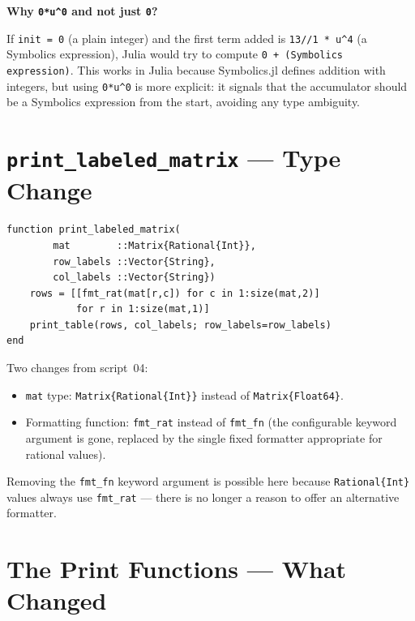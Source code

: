 \documentclass[12pt, a4paper]{article}
\newcommand{\cd}[1]{\texttt{#1}}
\begin{document}
\begin{notebox}
\textbf{Why \cd{0*u\^{}0} and not just \cd{0}?}

If \cd{init = 0} (a plain integer) and the first term
added is \cd{13//1 * u\^{}4} (a Symbolics expression),
Julia would try to compute \cd{0 + (Symbolics expression)}.
This works in Julia because Symbolics.jl defines addition
with integers, but using \cd{0*u\^{}0} is more explicit:
it signals that the accumulator should be a Symbolics
expression from the start, avoiding any type ambiguity.
\end{notebox}


\section{\texttt{print\_labeled\_matrix} --- Type Change}

\begin{verbatim}
function print_labeled_matrix(
        mat        ::Matrix{Rational{Int}},
        row_labels ::Vector{String},
        col_labels ::Vector{String})
    rows = [[fmt_rat(mat[r,c]) for c in 1:size(mat,2)]
            for r in 1:size(mat,1)]
    print_table(rows, col_labels; row_labels=row_labels)
end
\end{verbatim}

Two changes from script~04:
\begin{itemize}
  \item \cd{mat} type: \cd{Matrix\{Rational\{Int\}\}} instead
        of \cd{Matrix\{Float64\}}.
  \item Formatting function: \cd{fmt\_rat} instead of
        \cd{fmt\_fn} (the configurable keyword argument
        is gone, replaced by the single fixed formatter
        appropriate for rational values).
\end{itemize}

Removing the \cd{fmt\_fn} keyword argument is possible here
because \cd{Rational\{Int\}} values always use \cd{fmt\_rat}
--- there is no longer a reason to offer an alternative formatter.


\section{The Print Functions --- What Changed}
\end{document}
